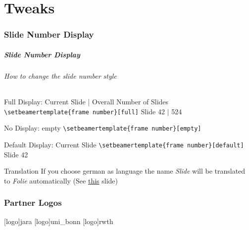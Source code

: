 \part{Tweaks}
\makepart
\section{Slide Number Display}

\begin{frame}[fragile,label=tweaks]
        \frametitle{Slide Number Display}
        \framesubtitle{How to change the slide number style}
        \begin{block}{Full Display: Current Slide | Overall Number of Slides}
                \scriptsize\verb+\setbeamertemplate{frame number}[full]+ \hfill
                \scriptsize{} Slide 42 $|$ 524
        \end{block}
        \begin{block}{No Display: empty}
                \scriptsize\verb+\setbeamertemplate{frame number}[empty]+ \hfill
                \scriptsize{}
        \end{block}
        \begin{block}{Default Display: Current Slide}
                \scriptsize\verb+\setbeamertemplate{frame number}[default]+ \hfill
                \scriptsize{} Slide 42
        \end{block}
        \begin{block}{Translation}
        If you choose german as language the name \emph{Slide} will be translated
        to \emph{Folie} automatically (See \hyperlink{translation}{\alert{this}}
        slide)
        \end{block}
\end{frame}

\section{Partner Logos}

[logo]{jara}%
[logo]{uni_bonn}%
[logo]{rwth}%

